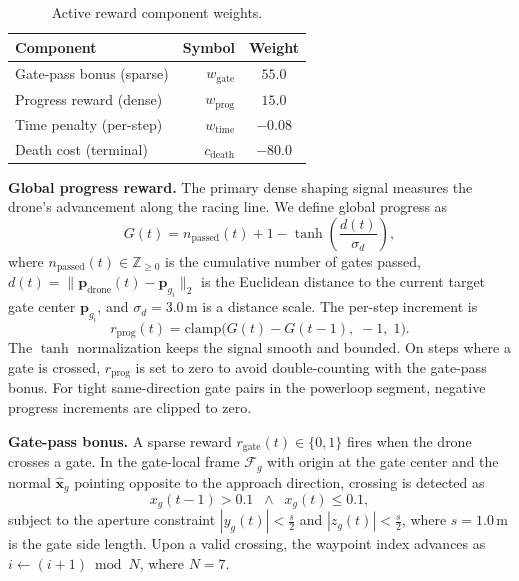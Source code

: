 \documentclass[conference]{IEEEtran}
\begin{document}
\begin{table}[h]
\centering
\caption{Active reward component weights.}
\label{tab:reward}
\begin{tabular}{@{}lrc@{}}
\toprule
\textbf{Component} & \textbf{Symbol} & \textbf{Weight} \\
\midrule
Gate-pass bonus (sparse) & $w_{\text{gate}}$ & $55.0$ \\
Progress reward (dense) & $w_{\text{prog}}$ & $15.0$ \\
Time penalty (per-step) & $w_{\text{time}}$ & $-0.08$ \\
Death cost (terminal) & $c_{\text{death}}$ & $-80.0$ \\
\bottomrule
\end{tabular}
\end{table}

\textbf{Global progress reward.}
The primary dense shaping signal measures the drone's advancement along the racing line. We define global progress as
\begin{equation}\label{eq:progress}
  G(t) = n_{\text{passed}}(t) + 1 - \tanh\!\left(\frac{d(t)}{\sigma_d}\right),
\end{equation}
where $n_{\text{passed}}(t) \in \mathbb{Z}_{\geq 0}$ is the cumulative number of gates passed, $d(t) = \|\mathbf{p}_{\text{drone}}(t) - \mathbf{p}_{g_i}\|_2$ is the Euclidean distance to the current target gate center $\mathbf{p}_{g_i}$, and $\sigma_d = 3.0$\,m is a distance scale. The per-step increment is
\begin{equation}\label{eq:rprog}
  r_{\text{prog}}(t) = \text{clamp}\!\bigl(G(t) - G(t{-}1),\; -1,\; 1\bigr).
\end{equation}
The $\tanh$ normalization keeps the signal smooth and bounded. On steps where a gate is crossed, $r_{\text{prog}}$ is set to zero to avoid double-counting with the gate-pass bonus. For tight same-direction gate pairs in the powerloop segment, negative progress increments are clipped to zero.

\textbf{Gate-pass bonus.}
A sparse reward $r_{\text{gate}}(t) \in \{0, 1\}$ fires when the drone crosses a gate. In the gate-local frame $\mathcal{F}_g$ with origin at the gate center and the normal $\hat{\mathbf{x}}_g$ pointing opposite to the approach direction, crossing is detected as
\begin{equation}\label{eq:gate_cross}
  x_g(t{-}1) > 0.1 \;\;\wedge\;\; x_g(t) \leq 0.1,
\end{equation}
subject to the aperture constraint $|y_g(t)| < \tfrac{s}{2}$ and $|z_g(t)| < \tfrac{s}{2}$, where $s = 1.0$\,m is the gate side length. Upon a valid crossing, the waypoint index advances as $i \leftarrow (i + 1) \bmod N$, where $N=7$.
\end{document}

